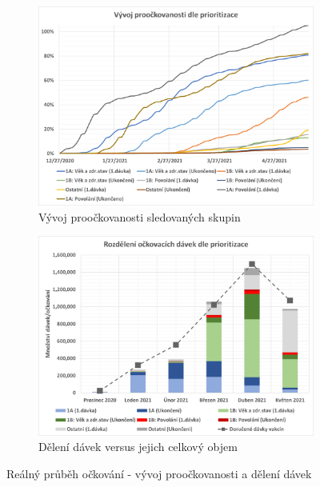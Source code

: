 \begin{figure}
\centering

\begin{subfigure}{0.9\textwidth}
\includegraphics[width=\textwidth]{assets/gr_proockovanost}
\caption{Vývoj proočkovanosti sledovaných skupin}
\label{gr_proockovanost}
\end{subfigure}

\begin{subfigure}{0.9\textwidth}
\includegraphics[width=\textwidth]{assets/gr_mesice}
\caption{Dělení dávek versus jejich celkový objem}
\label{gr_skupiny_davky}
\end{subfigure}

\caption{Reálný průběh očkování - vývoj proočkovanosti a dělení dávek}
\end{figure}


